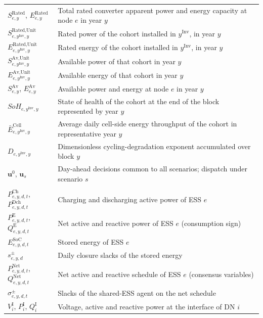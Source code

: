 \documentclass[preprint,12pt]{elsarticle}
\begin{document}
\begin{longtable}{@{}>{\raggedright\arraybackslash}p{} >{\raggedright\arraybackslash}p{}@{}}
        $S^{\text{Rated}}_{e,y}$, $E^{\text{Rated}}_{e,y}$ & Total rated converter apparent power and energy capacity at node $e$ in year $y$ \\
        $S^{\text{Rated,Unit}}_{e,y^\text{Inv},y}$ & Rated power of the cohort installed in $y^\text{Inv}$, in year $y$ \\
        $E^{\text{Rated,Unit}}_{e,y^\text{Inv},y}$ & Rated energy of the cohort installed in $y^\text{Inv}$, in year $y$ \\
        $S^{\text{Av,Unit}}_{e,y^\text{Inv},y}$ & Available power of that cohort in year $y$ \\
        $E^{\text{Av,Unit}}_{e,y^\text{Inv},y}$ & Available energy of that cohort in year $y$ \\
        $S^{\text{Av}}_{e,y}$, $E^{\text{Av}}_{e,y}$ & Available power and energy at node $e$ in year $y$ \\
        $SoH_{e,y^\text{Inv},y}$ & State of health of the cohort at the end of the block represented by year $y$ \\
        $\bar{E}^{\text{Cell}}_{e,y^\text{Inv},y}$ & Average daily cell-side energy throughput of the cohort in representative year $y$ \\
        $D_{e,y^\text{Inv},y}$ & Dimensionless cycling-degradation exponent accumulated over block $y$ \\        
        $\boldsymbol{u}^{0}$, $\boldsymbol{u}_s$ & Day-ahead decisions common to all scenarios; dispatch under scenario $s$ \\
        \midrule
        \multicolumn{2}{@{}l}{\textbf{Operation}}\\*
        $P^{\text{Ch}}_{e,y,d,t}$, $P^{\text{Dch}}_{e,y,d,t}$ & Charging and discharging active power of ESS $e$ \\
        $P^{\text{E}}_{e,y,d,t}$, $Q^{\text{E}}_{e,y,d,t}$ & Net active and reactive power of ESS $e$ (consumption sign) \\
        $E^{\text{SoC}}_{e,y,d,t}$ & Stored energy of ESS $e$ \\
        $s^{\pm}_{e,y,d}$ & Daily closure slacks of the stored energy \\
        $P^{\text{Net}}_{e,y,d,t}$, $Q^{\text{Net}}_{e,y,d,t}$ & Net active and reactive schedule of ESS $e$ (consensus variables) \\
        $\sigma^{\pm}_{e,y,d,t}$ & Slacks of the shared-ESS agent on the net schedule \\
        $V^{\text{I}}_{i}$, $P^{\text{I}}_{i}$, $Q^{\text{I}}_{i}$ & Voltage, active and reactive power at the interface of DN $i$ \\

\end{longtable}
\end{document}
